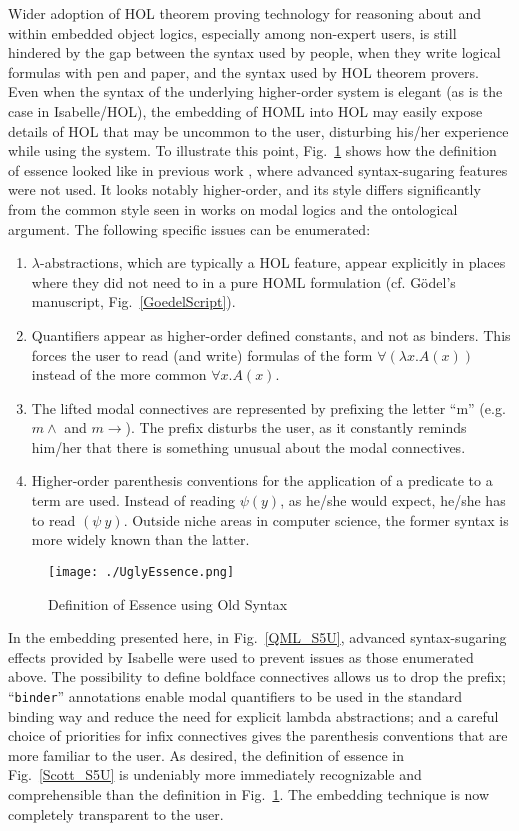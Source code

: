 \documentclass{article}
\newcommand{\imp}{{\rightarrow}}
\begin{document}
Wider adoption of HOL theorem proving technology for
reasoning about and within embedded object logics, especially among
non-expert users, is still hindered by the gap between the syntax used
by people, when they write logical formulas with pen and paper, and
the syntax used by HOL theorem provers. Even when the syntax of the
underlying higher-order system is elegant (as is the case in
Isabelle/HOL), the embedding of HOML into HOL may easily expose
details of HOL that may be uncommon to the user, disturbing his/her
experience while using the system. To illustrate this point,
Fig.~\ref{UglyEssence} shows how the definition of essence looked like
in previous work \cite{J28}, where advanced syntax-sugaring features
were not used. It looks notably higher-order, and its style differs
significantly from the common style seen in works on modal logics and
the ontological argument. The following specific issues can be
enumerated:
\begin{enumerate}
\item $\lambda$-abstractions, which are typically a HOL feature, appear explicitly in places where they did not need to in a pure HOML formulation (cf. G\"odel's manuscript, Fig.~\ref{GoedelScript}).
\item Quantifiers appear as higher-order defined constants, and not as binders. This forces the user to read (and write) formulas of the form $\forall (\lambda x. A(x))$ instead of the more common $\forall x. A(x)$.
\item The lifted modal connectives are represented by prefixing the
  letter ``m'' (e.g. $m\wedge$ and $m\imp$). The prefix disturbs the
  user, as it constantly reminds him/her that there is something
  unusual about the modal connectives.
\item Higher-order parenthesis conventions for the application of a predicate to a term are used. 
Instead of reading $\psi(y)$, as he/she would expect, he/she has to read $(\psi ~ y)$. Outside niche areas in computer science, the former syntax is more widely known than the latter.
\end{enumerate}


\begin{figure}
\centerline{\texttt{[image: ./UglyEssence.png]}}
\caption{Definition of Essence using Old Syntax} \label{UglyEssence}
\end{figure}

In the embedding presented here, in Fig.~\ref{QML_S5U}, advanced
syntax-sugaring effects provided by Isabelle were used to prevent
issues as those enumerated above. The possibility to define boldface connectives allows us to drop the prefix; ``\texttt{binder}'' annotations enable modal quantifiers to be used in the standard binding way and reduce the need for explicit lambda abstractions; and a careful choice of priorities for infix connectives gives the parenthesis conventions that are more familiar to the user. As desired, the definition of essence in Fig.~\ref{Scott_S5U} is undeniably more immediately recognizable and comprehensible than the definition in Fig.~\ref{UglyEssence}. The embedding technique is now completely transparent to the user.
\end{document}
